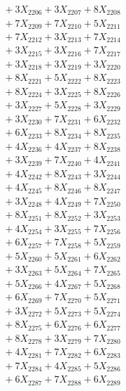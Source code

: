 \documentclass[a4paper,10pt]{article}
\begin{document}
{\begin{align}
&\;  + 3 X_{2206} + 3 X_{2207} + 8 X_{2208} \\[0.3ex]
&\;  + 7 X_{2209} + 7 X_{2210} + 5 X_{2211} \\[0.3ex]
&\;  + 7 X_{2212} + 3 X_{2213} + 7 X_{2214} \\[0.3ex]
&\;  + 3 X_{2215} + 3 X_{2216} + 7 X_{2217} \\[0.3ex]
&\;  + 3 X_{2218} + 3 X_{2219} + 3 X_{2220} \\[0.3ex]
&\;  + 8 X_{2221} + 5 X_{2222} + 8 X_{2223} \\[0.3ex]
&\;  + 8 X_{2224} + 3 X_{2225} + 8 X_{2226} \\[0.3ex]
&\;  + 3 X_{2227} + 5 X_{2228} + 3 X_{2229} \\[0.5ex]\allowbreak
&\;  + 3 X_{2230} + 7 X_{2231} + 6 X_{2232} \\[0.3ex]
&\;  + 6 X_{2233} + 8 X_{2234} + 8 X_{2235} \\[0.3ex]
&\;  + 4 X_{2236} + 4 X_{2237} + 8 X_{2238} \\[0.3ex]
&\;  + 3 X_{2239} + 7 X_{2240} + 4 X_{2241} \\[0.3ex]
&\;  + 4 X_{2242} + 8 X_{2243} + 3 X_{2244} \\[0.3ex]
&\;  + 4 X_{2245} + 8 X_{2246} + 8 X_{2247} \\[0.3ex]
&\;  + 3 X_{2248} + 4 X_{2249} + 7 X_{2250} \\[0.3ex]
&\;  + 8 X_{2251} + 8 X_{2252} + 3 X_{2253} \\[0.3ex]
&\;  + 4 X_{2254} + 3 X_{2255} + 7 X_{2256} \\[0.3ex]
&\;  + 6 X_{2257} + 7 X_{2258} + 5 X_{2259} \\[0.5ex]\allowbreak
&\;  + 5 X_{2260} + 5 X_{2261} + 6 X_{2262} \\[0.3ex]
&\;  + 3 X_{2263} + 5 X_{2264} + 7 X_{2265} \\[0.3ex]
&\;  + 5 X_{2266} + 4 X_{2267} + 5 X_{2268} \\[0.3ex]
&\;  + 6 X_{2269} + 7 X_{2270} + 5 X_{2271} \\[0.3ex]
&\;  + 3 X_{2272} + 5 X_{2273} + 5 X_{2274} \\[0.3ex]
&\;  + 8 X_{2275} + 6 X_{2276} + 6 X_{2277} \\[0.3ex]
&\;  + 8 X_{2278} + 3 X_{2279} + 7 X_{2280} \\[0.3ex]
&\;  + 4 X_{2281} + 7 X_{2282} + 6 X_{2283} \\[0.3ex]
&\;  + 7 X_{2284} + 4 X_{2285} + 5 X_{2286} \\[0.3ex]
&\;  + 6 X_{2287} + 7 X_{2288} + 6 X_{2289} \\[0.5ex]\allowbreak

\end{align}}
\end{document}
